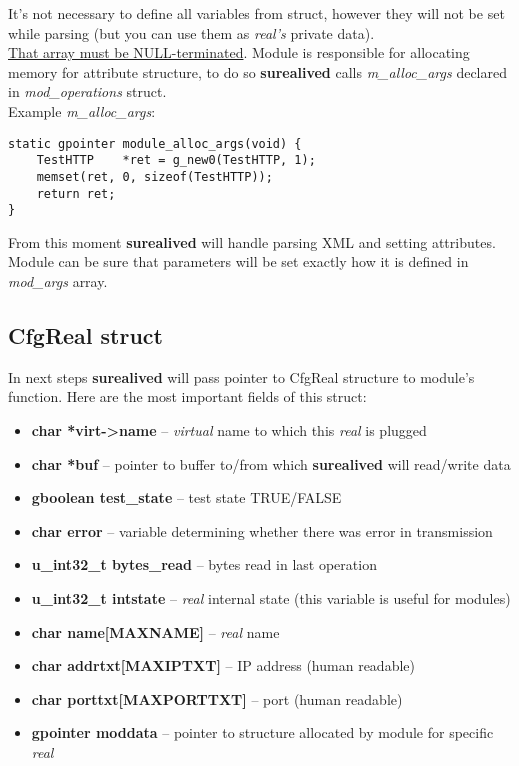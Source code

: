 \documentclass[polish,12pt]{article}
\begin{document}
It's not necessary to define all variables from struct, however they will not be set
while parsing (but you can use them as \textit{real's} private data).\\
\underline{That array must be NULL-terminated}.
\newline
Module is responsible for allocating memory for attribute structure, to do so
\textbf{surealived} calls \textit{m\_alloc\_args} declared in \textit{mod\_operations} struct.
\\Example \textit{m\_alloc\_args}:
{\small
\begin{verbatim}
static gpointer module_alloc_args(void) {
    TestHTTP    *ret = g_new0(TestHTTP, 1);
    memset(ret, 0, sizeof(TestHTTP));
    return ret;
}
\end{verbatim}
}
From this moment \textbf{surealived} will handle parsing XML and setting attributes.
Module can be sure that parameters will be set exactly how it is defined in \textit{mod\_args} array.

\subsection{CfgReal struct}
In next steps \textbf{surealived} will pass pointer to CfgReal structure to module's function.
Here are the most important fields of this struct:
\begin{itemize}
  \item \textbf{char *virt->name} -- \textit{virtual} name to which this \textit{real} is plugged
  \item \textbf{char *buf} -- pointer to buffer to/from which \textbf{surealived} will read/write data
  \item \textbf{gboolean test\_state} -- test state TRUE/FALSE
  \item \textbf{char error} -- variable determining whether there was error in transmission
  \item \textbf{u\_int32\_t bytes\_read} -- bytes read in last operation
  \item \textbf{u\_int32\_t intstate} -- \textit{real} internal state (this variable is useful for modules)
  \item \textbf{char name[MAXNAME]} -- \textit{real} name
  \item \textbf{char addrtxt[MAXIPTXT]} -- IP address (human readable)
  \item \textbf{char porttxt[MAXPORTTXT]} -- port (human readable)
  \item \textbf{gpointer moddata} -- pointer to structure allocated by module for specific \textit{real}
\end{itemize}
\end{document}
